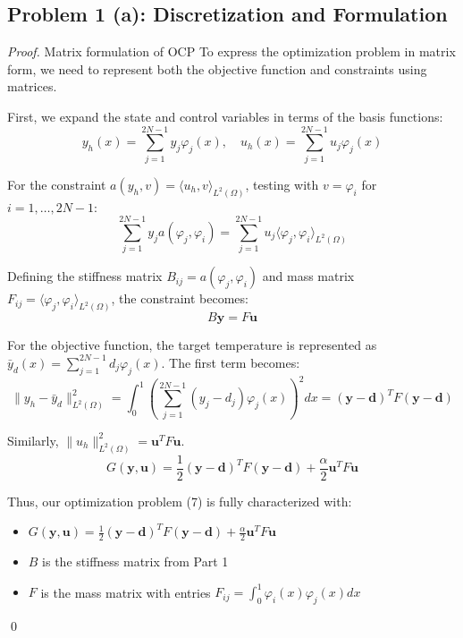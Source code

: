 \documentclass[a4paper,10pt]{article}
\begin{document}
\subsection*{Problem 1 (a): Discretization and Formulation}
\begin{proof}{Matrix formulation of OCP}{}
	To express the optimization problem in matrix form, we need to represent both the objective function and constraints using matrices.

	First, we expand the state and control variables in terms of the basis functions:
	\[
		y_h(x) = \sum_{j=1}^{2N-1} y_j \varphi_j(x), \quad
		u_h(x) = \sum_{j=1}^{2N-1} u_j \varphi_j(x)
	\]

	For the constraint \(a(y_h,v) = \langle u_h,v \rangle_{L^2(\Omega)}\), testing with \(v = \varphi_i\) for \(i=1,\dots,2N-1\):
	\[
		\sum_{j=1}^{2N-1} y_j a(\varphi_j,\varphi_i) = \sum_{j=1}^{2N-1} u_j \langle \varphi_j,\varphi_i \rangle_{L^2(\Omega)}
	\]

	Defining the stiffness matrix \(B_{ij} = a(\varphi_j,\varphi_i)\) and mass matrix \(F_{ij} = \langle \varphi_j,\varphi_i \rangle_{L^2(\Omega)}\), the constraint becomes:
	\[
		B \mathbf{y} = F \mathbf{u}
	\]

	For the objective function, the target temperature is represented as \(\bar{y}_d(x) = \sum_{j=1}^{2N-1} d_j \varphi_j(x)\). The first term becomes:
	\[
		\|y_h - \bar{y}_d\|^2_{L^2(\Omega)} = \int_0^1 \left(\sum_{j=1}^{2N-1} (y_j-d_j)\varphi_j(x)\right)^2 dx = (\mathbf{y}-\mathbf{d})^T F (\mathbf{y}-\mathbf{d})
	\]

	Similarly, \(\|u_h\|^2_{L^2(\Omega)} = \mathbf{u}^T F \mathbf{u}\).
	\[
		G(\mathbf{y},\mathbf{u}) = \frac{1}{2}(\mathbf{y}-\mathbf{d})^T F (\mathbf{y}-\mathbf{d}) + \frac{\alpha}{2} \mathbf{u}^T F \mathbf{u}
	\]

	Thus, our optimization problem (7) is fully characterized with:
	\begin{itemize}
		\item \(G(\mathbf{y},\mathbf{u}) = \frac{1}{2}(\mathbf{y}-\mathbf{d})^T F (\mathbf{y}-\mathbf{d}) + \frac{\alpha}{2} \mathbf{u}^T F \mathbf{u}\)
		\item \(B\) is the stiffness matrix from Part 1
		\item \(F\) is the mass matrix with entries \(F_{ij} = \int_0^1 \varphi_i(x)\varphi_j(x)dx\)
	\end{itemize}
	\qed
\end{proof}
\end{document}
